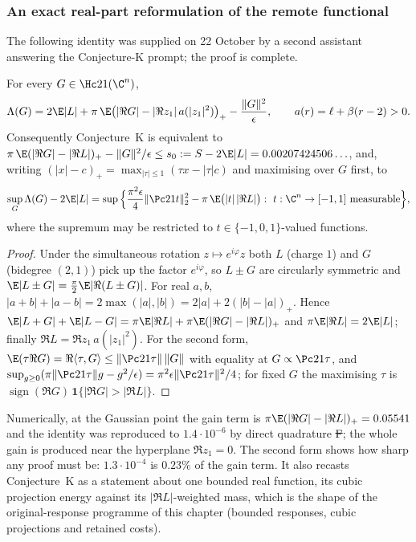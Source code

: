 \subsubsection{An exact real-part reformulation of the remote functional}
\label{sec:real-part-reformulation}
The following identity was supplied on 22 October by a second
assistant answering the Conjecture-K prompt; the proof is complete.
\begin{lemma}\label{lem:real-part-form}
For every $G\in\Hc21(\C^n)$,
\[
 \Lambda(G)=2\E|L|+\pi\,\E\big(|\Re G|-|\Re z_1|\,a(|z_1|^2)\big)_+-\frac{\|G\|^2}{\epsilon},
 \qquad a(r)=\ell+\beta(r-2)>0 .
\]
Consequently Conjecture~K is equivalent to
$\pi\,\E(|\Re G|-|\Re L|)_+-\|G\|^2/\epsilon\le s_0:=S-2\E|L|
=0.00207424506\ldots$, and, writing
$(|x|-c)_+=\max_{|\tau|\le1}(\tau x-|\tau|c)$ and maximising over $G$
first, to
\[
 \sup_{G}\Lambda(G)-2\E|L|
 =\sup\Big\{\frac{\pi^2\epsilon}4\|\Pc21t\|_2^2-\pi\,\E\big(|t|\,|\Re L|\big):
 \ t:\C^n\to[-1,1]\text{ measurable}\Big\},
\]
where the supremum may be restricted to $t\in\{-1,0,1\}$-valued
functions.
\end{lemma}
\begin{proof}
Under the simultaneous rotation $z\mapsto e^{i\varphi}z$ both $L$
(charge $1$) and $G$ (bidegree $(2,1)$) pick up the factor
$e^{i\varphi}$, so $L\pm G$ are circularly symmetric and
$\E|L\pm G|=\frac\pi2\E|\Re(L\pm G)|$. For real $a,b$,
$|a+b|+|a-b|=2\max(|a|,|b|)=2|a|+2(|b|-|a|)_+$. Hence
$\E|L+G|+\E|L-G|=\pi\E|\Re L|+\pi\E(|\Re G|-|\Re L|)_+$ and
$\pi\E|\Re L|=2\E|L|$; finally $\Re L=\Re z_1\,a(|z_1|^2)$.
For the second form, $\E(\tau\Re G)=\Re\langle\tau,G\rangle
\le\|\Pc21\tau\|\,\|G\|$ with equality at
$G\propto\Pc21\tau$, and $\sup_{g\ge0}(\pi\|\Pc21\tau\|g-g^2/\epsilon)
=\pi^2\epsilon\|\Pc21\tau\|^2/4$; for fixed $G$ the maximising $\tau$ is
$\operatorname{sign}(\Re G)\,\mathbf 1\{|\Re G|>|\Re L|\}$.
\end{proof}
Numerically, at the Gaussian point the gain term is
$\pi\E(|\Re G|-|\Re L|)_+=0.05541$ and the identity was reproduced to
$1.4\cdot10^{-6}$ by direct quadrature \st{F}; the whole gain is
produced near the hyperplane $\Re z_1=0$. The second form shows how
sharp any proof must be: $1.3\cdot10^{-4}$ is $0.23\%$ of the gain
term. It also recasts Conjecture~K as a statement about one bounded real
function, its cubic projection energy against its $|\Re L|$-weighted
mass, which is the shape of the original-response programme of this
chapter (bounded responses, cubic projections and retained costs).

